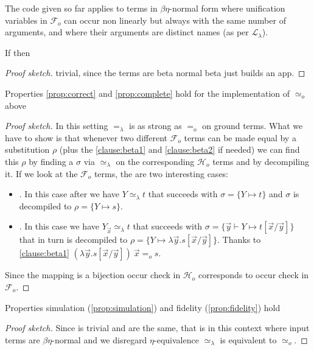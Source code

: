 \documentclass[sigconf,natbib=false,review]{acmart}
\newcommand{\EqualRel}{\ensuremath{=}}
\newcommand{\UnifRel}{\ensuremath{\simeq}}
\newcommand{\Uo}{\ensuremath{\UnifRel_o}\xspace}
\newcommand{\Eo}{\ensuremath{\EqualRel_o}\xspace}
\newcommand{\Ue}{\ensuremath{\UnifRel_\lambda}\xspace}
\newcommand{\Ee}{\ensuremath{\EqualRel_\lambda}\xspace}
\newcommand{\llambda}{\ensuremath{\mathcal{L}_\lambda}\xspace}
\newcommand{\Fo}{\ensuremath{\mathcal{F}_{\!o}\xspace}} %
\newcommand{\Ho}{\ensuremath{\mathcal{H}_o}\xspace}
\begin{document}


The code given so far applies to terms in $\beta\eta$-normal form where
unification variables in \Fo{} can occur non linearly but always with
the same number of arguments, and where their arguments are distinct names
(as per \llambda).

\begin{lemma} If
   then 
\end{lemma}
\begin{proof}[Proof sketch]
trivial, since the terms are beta normal beta just builds an app.
\end{proof}


\begin{lemma}
Properties \ref{prop:correct} and
\ref{prop:complete} hold for the implementation of \Uo above
\end{lemma}
\begin{proof}[Proof sketch]
 In this setting \Ee is as strong as
\Eo on ground terms. What we have to show is that whenever two different \Fo
terms can be made equal by a substitution $\rho$ (plus the \ref{clause:beta1}
and \ref{clause:beta2} if needed) we can find this $\rho$ by finding
a $\sigma$ via \Ue{} on the corresponding \Ho terms and by decompiling it.
If we look at the \Fo{} terms, the are two interesting cases:
\begin{itemize}
\item \elpiIn{fuva X ~\Uo~s}. In this case after  we have
  $Y \Ue t$ that succeeds with $\sigma = \{ Y \mapsto t\}$ and
  $\sigma$ is decompiled to $\rho = \{ Y \mapsto s\}$.
\item \elpiIn{fapp[fuva X|L] ~\Uo~s}. In this case
 we have $Y_{\vec{x}} \Ue t$ that succeeds with
 $\sigma = \{ \vec{y} \vdash Y \mapsto t[\vec{x}/\vec{y}]\}$ that in turn
 is decompiled to $\rho = \{ Y \mapsto \lambda \vec{y}.s[\vec{x}/\vec{y}]\}$.
 Thanks to \ref{clause:beta1}
 $(\lambda \vec{y}.s[\vec{x}/\vec{y}])~\vec{x} \Eo s$.
\end{itemize}
Since the mapping is a bijection occur check in \Ho{} corresponds to occur
check in \Fo{}.
\end{proof}

\begin{lemma} Properties simulation (\ref{prop:simulation}) and
fidelity (\ref{prop:fidelity}) hold
\end{lemma}
\begin{proof}[Proof sketch]
Since  is trivial \fstep and \hstep are the same, that is
in this
context where input terms are $\beta\eta$-normal and we disregard $\eta$-equivalence
\Ue is equivalent to \Uo.
\end{proof}
\end{document}
